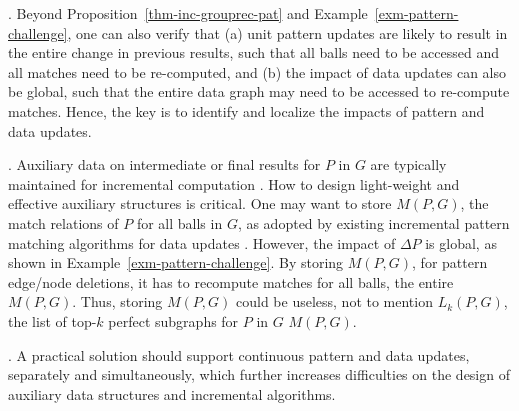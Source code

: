 

.
Beyond Proposition~\ref{thm-inc-grouprec-pat} and Example~\ref{exm-pattern-challenge}, one can also verify that (a) unit pattern updates are likely to result in the entire change in previous results, such that all balls need to be accessed and all matches need to be re-computed,
and (b) the impact of data updates can also be global, such that the entire data graph may need to be accessed to re-compute matches.
Hence, the key is to identify and localize the impacts of pattern and data updates.



.
Auxiliary data on intermediate or final results for $P$ in $G$ are typically maintained for incremental computation \cite{Reps96,FanWW13-tods}.
How to design light-weight and effective auxiliary structures is critical.
One may want to store $M(P,G)$, the match relations of $P$ for all balls in $G$,
as adopted by existing incremental pattern matching algorithms for data updates \cite{FanWW13-tods}.
However, the impact of $\Delta P$ is global, as shown in Example~\ref{exm-pattern-challenge}.
By storing $M(P,G)$, for pattern edge/node deletions, it has to recompute matches for all balls, \ie the entire $M(P,G)$.
Thus, storing $M(P,G)$ could be useless, not to mention $L_{k}(P,G)$, the list of top-$k$ perfect subgraphs for $P$ in $G$ \wrt $M(P,G)$.

.
A practical solution should support continuous pattern and data updates, separately and simultaneously, which further increases difficulties on the design of auxiliary data structures and incremental algorithms.

